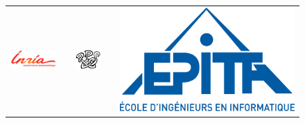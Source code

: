 \begin{titlepage}
\begin{center}
\begin{figure}[h]
\begin{tabular}{ccccc}
\includegraphics[scale=0.8]{data/inria.jpg} & &
\includegraphics{data/pps.png} & &
\includegraphics[scale=0.8]{data/epita.jpg}
\end{tabular}
\end{figure}

\end{center}
\end{titlepage}
